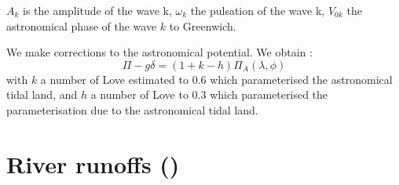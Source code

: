 $A_{k}$ is the amplitude of the wave k, $\omega_{k}$ the pulsation of the wave k, $V_{0k}$ the astronomical phase of the wave
$k$ to Greenwich.

We make corrections to the astronomical potential.
We obtain : 
\begin{equation}
\Pi-g\delta = (1+k-h) \Pi_{A}(\lambda,\phi)
\end{equation}
with $k$ a number of Love estimated to 0.6 which parameterised the astronomical tidal land,
and $h$ a number of Love to 0.3 which parameterised the parameterisation due to the astronomical tidal land.

\section   [River runoffs (\textit{sbcrnf})]
			{River runoffs ()}
\label{SBC_rnf}





